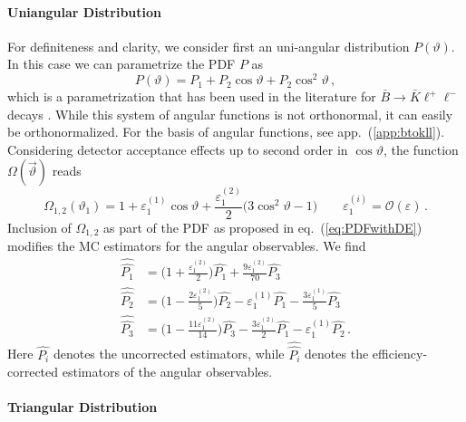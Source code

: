 \documentclass[aps,prd,reprint,nofootinbib,preprintnumbers]{revtex4}
\newcommand{\refapp}[1]{app.~(\ref{app:#1})}
\newcommand{\refeq}[1]{eq.~(\ref{eq:#1})}
\renewcommand{\theta}{\vartheta}
\newcommand{\order}[1]{\mathcal{O}\left({#1}\right)}
\let\eps\varepsilon
\newcommand{\what}[1]{\widehat{#1}}
\newcommand{\wwhat}[1]{\widehat{\widehat{#1}}}
\begin{document}
\paragraph{Uniangular Distribution}
For definiteness and clarity, we consider first an uni-angular distribution $P(\theta)$.
In this case we can parametrize the PDF $P$ as
\begin{equation}
    P(\theta) = P_1 + P_2 \cos\theta + P_2 \cos^2\theta\,,
\end{equation}
which is a parametrization that has been used in the literature for $\bar{B}\to\bar{K}\ell^+\ell^-$ decays \cite{Bobeth:2007dw}.
While this system of angular functions is not orthonormal, it can easily be orthonormalized. For the basis of angular
functions, see \refapp{btokll}.
Considering detector acceptance effects up to second order in $\cos\theta$, the function $\Omega(\vec\theta)$ reads
\begin{equation}
    \Omega_{1,2}(\theta_1) = 1 + \eps_{1}^{(1)} \cos\theta + \frac{\eps_{1}^{(2)}}{2}\big(3 \cos^2\theta - 1\big)\qquad\eps_{1}^{(i)} = \order{\eps}\,.
\end{equation}
Inclusion of $\Omega_{1,2}$ as part of the PDF as proposed in \refeq{PDFwithDE} modifies the MC estimators for the angular observables.
We find
\begin{equation}
\begin{aligned}
    \wwhat{P_1} & = \Big(1 + \frac{\eps_{1}^{(2)}}{2}\Big) \what{P_1} + \frac{9 \eps_{1}^{(2)}}{70} \what{P_3}\\
    \wwhat{P_2} & = \Big(1 - \frac{2 \eps_{1}^{(2)}}{5}\Big) \what{P_2} - \eps_{1}^{(1)} \what{P_1} - \frac{3\eps_{1}^{(1)}}{5} \what{P_3}\\
    \wwhat{P_3} & = \Big(1 - \frac{11\eps_{1}^{(2)}}{14}\Big)\what{P_3} - \frac{3\eps_{1}^{(2)}}{2} \what{P_1} - \eps_{1}^{(1)} \what{P_2}\,.
\end{aligned}
\end{equation}
Here $\what{P_i}$ denotes the uncorrected estimators, while $\wwhat{P_i}$ denotes the efficiency-corrected estimators of the angular observables.\\

\paragraph{Triangular Distribution}

\begin{table}
    \resizebox{.99\textwidth}{!}{\ensuremath{}}\\[2.5\medskipamount]
    \resizebox{.99\textwidth}{!}{\ensuremath{}}\\[2.5\medskipamount]
    \resizebox{.99\textwidth}{!}{\ensuremath{}}
    \caption{The matrix $N_{ij}$ that appears in \refeq{eff-corrected-est-btokstarll}. Due to spatial
        constraints, we split its display into columns $j=1s,1c,1i,2s,2c,2i$ (top),
        $j=3,4,4i,5,5i,6s$ (middle) and $j=6c,7,7i,8,8i,9$ (bottom).
        \label{tab:eff-corrected-est-btokstarll}
    }
\end{table}
\end{document}
